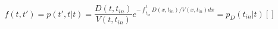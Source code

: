 \begin{equation}
f(t,t') = p(t',t|t)=  \frac{D(t,t_{in})}{V(t,t_{in})}e^{-\int_{t_{in}}^t D(x,t_{in})/V(x,t_{in}) dx} = p_D(t_{in}|t)\left[ \right]
\end{equation}